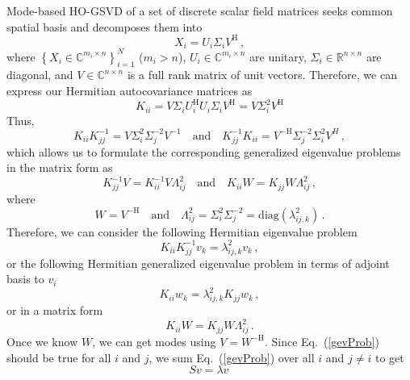 \documentclass[10pt]{article}
\newcommand{\eq}[1]{Eq.\ (\ref{#1})}
\begin{document}
Mode-based HO-GSVD of a set of discrete scalar field matrices seeks common spatial basis and decomposes them into
\begin{equation}
    X_i = U_i \Sigma_i V^\mathrm{H}\,,
\end{equation}
where $\left\{X_i\in\mathbb{C}^{m_i\times n}\right\}_{i=1}^N$ ($m_i>n$), $U_i\in\mathbb{C}^{m_i\times n}$ are unitary, $\Sigma_i\in\mathbb{R}^{n\times n}$ are diagonal, and $V\in\mathbb{C}^{n\times n}$ is a full rank matrix of unit vectors.
Therefore, we can express our Hermitian autocovariance matrices as
\begin{equation}
    K_{ii} = V \Sigma_i U_i^\mathrm{H}  U_i\Sigma_i V^\mathrm{H} = V\Sigma_{i}^2V^\mathrm{H}
\end{equation}
Thus,
\begin{equation}
    K_{ii}K_{jj}^{-1} = V\Sigma_{i}^2\Sigma_{j}^{-2}V^{-1} \quad \mathrm{and} \quad K_{jj}^{-1}K_{ii} = V^\mathrm{-H}\Sigma_{j}^{-2}\Sigma_{i}^2V^{H}\,,
\end{equation}
which allows us to formulate the corresponding generalized eigenvalue problems in the matrix form as
\begin{equation}
     K_{jj}^{-1} V = K_{ii}^{-1} V \Lambda_{ij}^2 \quad \mathrm{and} \quad K_{ii} W = K_{jj} W\Lambda_{ij}^2\,,
\end{equation}
where
\begin{equation}
    W = V^\mathrm{-H}\quad \mathrm{and}\quad \Lambda_{ij}^2 = \Sigma_{i}^2\Sigma_{j}^{-2} = \mathrm{diag}(\lambda_{ij,k}^2)\,.
\end{equation}
Therefore, we can consider the following Hermitian eigenvalue problem
\begin{equation}\label{gevProb}
    K_{ii}K_{jj}^{-1} v_k = \lambda^2_{ij,k} v_k\,,    
\end{equation}
or the following Hermitian generalized eigenvalue problem in terms of adjoint basis to $v_i$
\begin{equation}
    K_{ii} w_k = \lambda^2_{ij,k} K_{jj}w_k\,,
\end{equation}
or in a matrix form
\begin{equation}
        K_{ii} W = K_{jj}W \Lambda^2_{ij}\,.
\end{equation}
Once we know $W$, we can get modes using $V = W^{-\mathrm{H}}$.
Since  \eq{gevProb} should be true for all $i$ and $j$, we sum \eq{gevProb} over all $i$ and $j\ne i$ to get
\begin{equation}
     S v = \lambda v\,
\end{equation}
\end{document}

